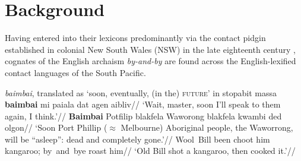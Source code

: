 \section{Background}\label{bambai.intro}

Having entered into their lexicons predominantly via the contact pidgin established in colonial New South Wales (NSW) in the late eighteenth century \citep{Troy1994}, cognates of the English archaism \textit{by-and-by} are found across the English-lexified contact languages of the South Pacific. 


\pex[aboveglftskip=0ex] \textit{baimbai}, translated as `soon, eventually, (in the) \textsc{future}' in \citet{Troy1994} 
\a\begingl\gla stopabit massa \textbf{baimbai} mi paiala dat agen aibliv//
\glft`Wait, master, soon I'll speak to them again, I think.'//\endgl
\a\begingl\gla \textbf{Baimbai} Potfilip blakfela Waworong blakfela kwambi ded olgon//
\glft`Soon Port Phillip ($ \approx $ Melbourne) Aboriginal people, the Waworrong, will be ``asleep'': dead and completely gone.'//\endgl
\a\begingl\gla Wool~Bill been choot him kangaroo; by~and~bye roast him//
\glft`Old Bill shot a kangaroo, then cooked it.'//\endgl
\xe
{}

